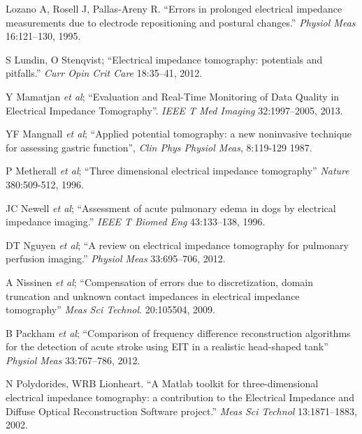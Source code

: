 \documentclass[10pt,journal]{IEEEtran}\def\TBLWIDA{15mm}\def\TBLWIDB{60mm}
\newcommand{\ifmaxthree}[2]{#2 {\em et al}; }
\begin{document}
\begin{thebibliography}{00}
Lozano A, Rosell J, Pallas-Areny R. 
``Errors in prolonged electrical impedance measurements due to electrode repositioning and postural changes.''
{\em  Physiol Meas} 16:121--130, 1995.

S Lundin, O Stenqvist;
``Electrical impedance tomography: potentials and pitfalls.''
{\em Curr Opin Crit Care} 18:35--41, 2012.


\ifmaxthree{
Y Mamatjan, B Grychtol, P Gaggero, J Justiz, V Koch, A Adler. 
}{
Y Mamatjan
}
``Evaluation and Real-Time Monitoring of Data Quality in Electrical Impedance Tomography''.
{\em IEEE T Med Imaging} 32:1997--2005, 2013.

\ifmaxthree{
YF Mangnall, AJ Baxter, R Avill, NC Bird, BH Brown, DC Barber, AD Seagar, AG Johnson, NW Read
}{
YF Mangnall
}
``Applied potential tomography: a new noninvasive technique for assessing gastric function'',
{\em Clin Phys Physiol Meas}, 8:119-129 1987.

\ifmaxthree{
P Metherall, DC Barber, RH Smallwood, BH Brown.
}{
P Metherall
}
``Three dimensional electrical impedance tomography''
{\em Nature} 380:509-512, 1996.

\ifmaxthree{
JC Newell, PM Edic, X Ren, JL Larson-Wiseman, MD Danyleiko,
}{
JC Newell
}
``Assessment of acute pulmonary edema in dogs by electrical impedance imaging.''
{\em  IEEE T Biomed Eng} 43:133--138, 1996.

\ifmaxthree{
DT Nguyen, C Jin, A Thiagalingam, AL McEwan
}{
DT Nguyen
}
``A review on electrical impedance tomography for pulmonary perfusion imaging.''
{\em Physiol Meas} 33:695--706, 2012.

\ifmaxthree{
A Nissinen, LM Heikkinen, V Kolehmainen, JP Kaipio
}{
A Nissinen
}
``Compensation of errors due to discretization, domain truncation and unknown contact impedances in electrical impedance tomography''
{\em  Meas Sci Technol}. 20:105504, 2009.

\ifmaxthree{
B Packham, H Koo, A Romsauerova, S Ahn, A McEwan, SC Jun, DS Holder,
}{
B Packham
}
``Comparison of frequency difference reconstruction algorithms for the detection of acute stroke using EIT in a realistic head-shaped tank''
{\em Physiol Meas} 33:767--786, 2012.



N Polydorides, WRB Lionheart. 
``A Matlab toolkit for three-dimensional electrical impedance tomography: a contribution to the Electrical Impedance and Diffuse Optical Reconstruction Software project.''
{\em Meas Sci Technol} 13:1871--1883, 2002.


\end{thebibliography}
\end{document}
